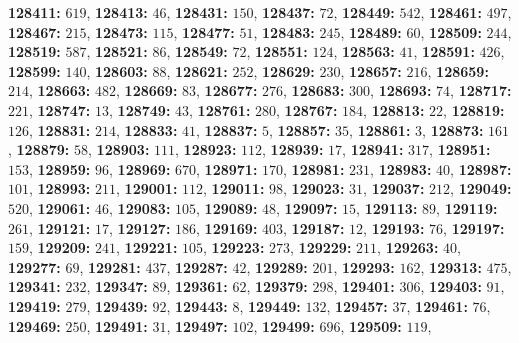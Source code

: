 \textsf{\bfseries 128411:} $619$, \textsf{\bfseries 128413:} $46$, \textsf{\bfseries 128431:} $150$, \textsf{\bfseries 128437:} $72$, \textsf{\bfseries 128449:} $542$, \textsf{\bfseries 128461:} $497$, \textsf{\bfseries 128467:} $215$, \textsf{\bfseries 128473:} $115$, \textsf{\bfseries 128477:} $51$, \textsf{\bfseries 128483:} $245$, \textsf{\bfseries 128489:} $60$, \textsf{\bfseries 128509:} $244$, \textsf{\bfseries 128519:} $587$, \textsf{\bfseries 128521:} $86$, \textsf{\bfseries 128549:} $72$, \textsf{\bfseries 128551:} $124$, \textsf{\bfseries 128563:} $41$, \textsf{\bfseries 128591:} $426$, \textsf{\bfseries 128599:} $140$, \textsf{\bfseries 128603:} $88$, \textsf{\bfseries 128621:} $252$, \textsf{\bfseries 128629:} $230$, \textsf{\bfseries 128657:} $216$, \textsf{\bfseries 128659:} $214$, \textsf{\bfseries 128663:} $482$, \textsf{\bfseries 128669:} $83$, \textsf{\bfseries 128677:} $276$, \textsf{\bfseries 128683:} $300$, \textsf{\bfseries 128693:} $74$, \textsf{\bfseries 128717:} $221$, \textsf{\bfseries 128747:} $13$, \textsf{\bfseries 128749:} $43$, \textsf{\bfseries 128761:} $280$, \textsf{\bfseries 128767:} $184$, \textsf{\bfseries 128813:} $22$, \textsf{\bfseries 128819:} $126$, \textsf{\bfseries 128831:} $214$, \textsf{\bfseries 128833:} $41$, \textsf{\bfseries 128837:} $5$, \textsf{\bfseries 128857:} $35$, \textsf{\bfseries 128861:} $3$, \textsf{\bfseries 128873:} $161$, \textsf{\bfseries 128879:} $58$, \textsf{\bfseries 128903:} $111$, \textsf{\bfseries 128923:} $112$, \textsf{\bfseries 128939:} $17$, \textsf{\bfseries 128941:} $317$, \textsf{\bfseries 128951:} $153$, \textsf{\bfseries 128959:} $96$, \textsf{\bfseries 128969:} $670$, \textsf{\bfseries 128971:} $170$, \textsf{\bfseries 128981:} $231$, \textsf{\bfseries 128983:} $40$, \textsf{\bfseries 128987:} $101$, \textsf{\bfseries 128993:} $211$, \textsf{\bfseries 129001:} $112$, \textsf{\bfseries 129011:} $98$, \textsf{\bfseries 129023:} $31$, \textsf{\bfseries 129037:} $212$, \textsf{\bfseries 129049:} $520$, \textsf{\bfseries 129061:} $46$, \textsf{\bfseries 129083:} $105$, \textsf{\bfseries 129089:} $48$, \textsf{\bfseries 129097:} $15$, \textsf{\bfseries 129113:} $89$, \textsf{\bfseries 129119:} $261$, \textsf{\bfseries 129121:} $17$, \textsf{\bfseries 129127:} $186$, \textsf{\bfseries 129169:} $403$, \textsf{\bfseries 129187:} $12$, \textsf{\bfseries 129193:} $76$, \textsf{\bfseries 129197:} $159$, \textsf{\bfseries 129209:} $241$, \textsf{\bfseries 129221:} $105$, \textsf{\bfseries 129223:} $273$, \textsf{\bfseries 129229:} $211$, \textsf{\bfseries 129263:} $40$, \textsf{\bfseries 129277:} $69$, \textsf{\bfseries 129281:} $437$, \textsf{\bfseries 129287:} $42$, \textsf{\bfseries 129289:} $201$, \textsf{\bfseries 129293:} $162$, \textsf{\bfseries 129313:} $475$, \textsf{\bfseries 129341:} $232$, \textsf{\bfseries 129347:} $89$, \textsf{\bfseries 129361:} $62$, \textsf{\bfseries 129379:} $298$, \textsf{\bfseries 129401:} $306$, \textsf{\bfseries 129403:} $91$, \textsf{\bfseries 129419:} $279$, \textsf{\bfseries 129439:} $92$, \textsf{\bfseries 129443:} $8$, \textsf{\bfseries 129449:} $132$, \textsf{\bfseries 129457:} $37$, \textsf{\bfseries 129461:} $76$, \textsf{\bfseries 129469:} $250$, \textsf{\bfseries 129491:} $31$, \textsf{\bfseries 129497:} $102$, \textsf{\bfseries 129499:} $696$, \textsf{\bfseries 129509:} $119$, 
